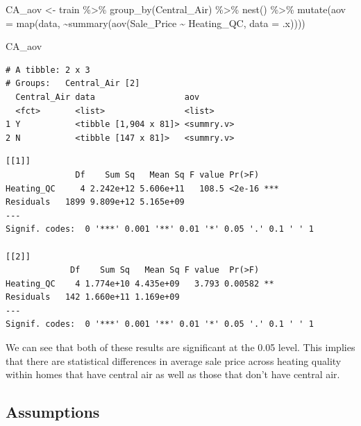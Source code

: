 \documentclass[
  letterpaper,
  DIV=11,
  numbers=noendperiod]{scrreprt}
\newenvironment{Shaded}{\begin{snugshade}}{\end{snugshade}}
\newcommand{\AttributeTok}[1]{\textcolor[rgb]{0.40,0.45,0.13}{#1}}
\newcommand{\FunctionTok}[1]{\textcolor[rgb]{0.28,0.35,0.67}{#1}}
\newcommand{\NormalTok}[1]{\textcolor[rgb]{0.00,0.23,0.31}{#1}}
\newcommand{\OtherTok}[1]{\textcolor[rgb]{0.00,0.23,0.31}{#1}}
\newcommand{\SpecialCharTok}[1]{\textcolor[rgb]{0.37,0.37,0.37}{#1}}
\begin{document}
\begin{Shaded}
\begin{Highlighting}[]
\NormalTok{CA\_aov }\OtherTok{\textless{}{-}}\NormalTok{ train }\SpecialCharTok{\%\textgreater{}\%} 
  \FunctionTok{group\_by}\NormalTok{(Central\_Air) }\SpecialCharTok{\%\textgreater{}\%}
  \FunctionTok{nest}\NormalTok{() }\SpecialCharTok{\%\textgreater{}\%}
  \FunctionTok{mutate}\NormalTok{(}\AttributeTok{aov =} \FunctionTok{map}\NormalTok{(data, }\SpecialCharTok{\textasciitilde{}}\FunctionTok{summary}\NormalTok{(}\FunctionTok{aov}\NormalTok{(Sale\_Price }\SpecialCharTok{\textasciitilde{}}\NormalTok{ Heating\_QC, }\AttributeTok{data =}\NormalTok{ .x))))}

\NormalTok{CA\_aov}
\end{Highlighting}
\end{Shaded}

\begin{verbatim}
# A tibble: 2 x 3
# Groups:   Central_Air [2]
  Central_Air data                  aov       
  <fct>       <list>                <list>    
1 Y           <tibble [1,904 x 81]> <summry.v>
2 N           <tibble [147 x 81]>   <summry.v>
\end{verbatim}

\begin{Shaded}
\end{Shaded}

\begin{verbatim}
[[1]]
              Df    Sum Sq   Mean Sq F value Pr(>F)    
Heating_QC     4 2.242e+12 5.606e+11   108.5 <2e-16 ***
Residuals   1899 9.809e+12 5.165e+09                   
---
Signif. codes:  0 '***' 0.001 '**' 0.01 '*' 0.05 '.' 0.1 ' ' 1

[[2]]
             Df    Sum Sq   Mean Sq F value  Pr(>F)   
Heating_QC    4 1.774e+10 4.435e+09   3.793 0.00582 **
Residuals   142 1.660e+11 1.169e+09                   
---
Signif. codes:  0 '***' 0.001 '**' 0.01 '*' 0.05 '.' 0.1 ' ' 1
\end{verbatim}

We can see that both of these results are significant at the 0.05 level.
This implies that there are statistical differences in average sale
price across heating quality within homes that have central air as well
as those that don't have central air.

\hypertarget{assumptions}{%
\subsection{Assumptions}\label{assumptions}}
\end{document}
